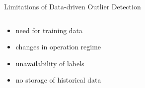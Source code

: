 \documentclass[aspectratio=169]{beamer}
\begin{document}
\begin{frame}{Limitations of Data-driven Outlier Detection}

    \begin{columns}
        \begin{column}{0.62\textwidth}
            \begin{itemize}[<+->]
                \item need for training data
                \item changes in operation regime
                \item unavailability of labels
                \item no storage of historical data
            \end{itemize}
        \end{column}
        \begin{column}{0.38\textwidth}
\end{column}
\end{columns}
\end{frame}
\end{document}

